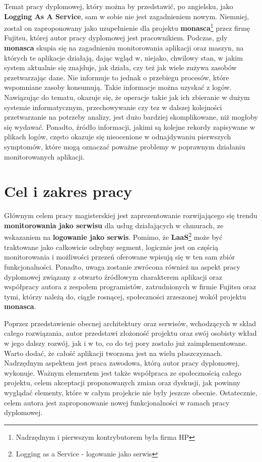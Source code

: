 Temat pracy dyplomowej, który można by przedstawić, po angielsku, jako \textbf{Logging As A Service}, sam w sobie nie jest zagadnieniem
nowym. Niemniej, został on zaproponowany jako uzupełnienie dla projektu \textbf{monasca}\footnote{Nadrzędnym i pierwszym kontrybutorem była firma HP} przez
firmę Fujitsu, której autor pracy dyplomowej jest pracownikiem. 
Podczas, gdy \textbf{monasca} skupia się na zagadnieniu monitorowania aplikacji oraz maszyn, na których te aplikacje działają, dając wgląd w, niejako,
chwilowy stan, w jakim system aktualnie się znajduje, jak działa, czy też jak wiele zużywa zasobów przetwarzając dane. Nie informuje to jednak o 
przebiegu procesów, które wspomniane zasoby konsumują. Takie informacje można uzyskać z logów. Nawiązując do tematu, okazuje się, że operacje takie jak 
ich zbieranie w dużym systemie informatycznym, przechowywanie czy tez w dalszej kolejności przetwarzanie na potrzeby analizy, jest dużo bardziej 
skomplikowane, niż mogłoby się wydawać. Ponadto, źródło informacji, jakimi są kolejne rekordy zapisywane w plikach logów, często okazuje się nieocenione w 
odnajdywaniu pierwszych symptomów, które mogą oznaczać poważne problemy w poprawnym działaniu monitorowanych aplikacji.

\section{Cel i zakres pracy}

Głównym celem pracy magisterskiej jest zaprezentowanie rozwijającego się trendu \textbf{monitorowania jako serwisu} dla usług działających w chmurach,
ze wskazaniem na \textbf{logowanie jako serwis}. Pomimo, że \textbf{LaaS}\footnote{Logging as a Service - logowanie jako serwis} 
może być traktowane jako całkowicie odrębny segment, logicznie jest on częścią monitorowania i możliwości przezeń oferowane wpisują się w ten sam
zbiór funkcjonalności. Ponadto, uwaga zostanie zwrócona również na aspekt pracy dyplomowej związany z otwarto źródłowym charakterem aplikacji oraz
współpracy autora z zespołem programistów, zatrudnionych w firmie Fujitsu oraz tymi, którzy należą do, ciągle rosnącej, społeczności zrzeszonej wokół
projektu \textbf{monasca}. 

Poprzez przedstawienie obecnej architektury oraz serwisów, wchodzących w skład całego rozwiązania, autor przedstawi złożoność projektu
oraz swój osobisty wkład w jego dalszy rozwój, jak i w to, co do tej pory zostało już zaimplementowane. Warto dodać, że całość
aplikacji tworzona jest na wielu płaszczyznach. Nadrzędnym aspektem jest praca zawodowa, którą autor pracy dyplomowej, wykonuje.
Ważnym elementem jest także współpraca ze społecznością całego projektu, celem akceptacji proponowanych zmian
oraz dyskusji, jak powinny wyglądać elementy, które w całym projekcie nie były jeszcze obecnie. Ostatecznie, celem autora 
jest zaproponowanie nowej funkcjonalności w ramach pracy dyplomowej.

